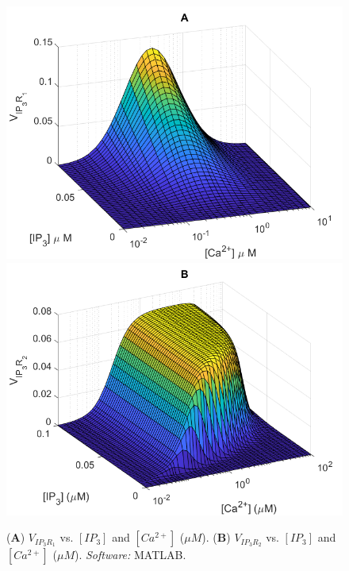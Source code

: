 \begin{figure}[!htb]
  \includegraphics[width=\linewidth]{Chapters/4_Kowalewski_model/extras/deyoungkeizer3d2.png}
\endminipage\hfill
{}
  \includegraphics[width=\linewidth]{Chapters/4_Kowalewski_model/extras/swedishmak.png}
\endminipage\hfill
\caption{(\textbf{A}) $V_{IP_3R_1}$ vs. $[IP_3]$ and $[Ca^{2+}]$ ($\mu M$). (\textbf{B}) $V_{IP_3R_2}$ vs. $[IP_3]$ and $[Ca^{2+}]$ ($\mu M$). \cite{swedish,deyoungkeizer, Mak1998} \textit{Software:} MATLAB. }\label{deyoungkeizer3d}
\end{figure}

